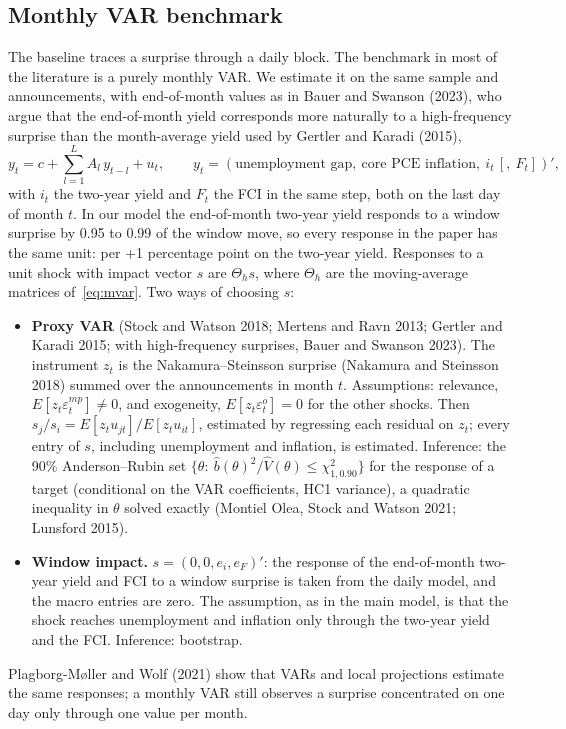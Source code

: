 \documentclass[11pt]{article}
\begin{document}
\subsection{Monthly VAR benchmark}
The baseline traces a surprise through a daily block. The benchmark in most of the literature is a purely monthly VAR. We estimate it on the same sample and announcements, with end-of-month values as in Bauer and Swanson (2023), who argue that the end-of-month yield corresponds more naturally to a high-frequency surprise than the month-average yield used by Gertler and Karadi (2015),
\begin{equation}\label{eq:mvar} y_t = c + \sum_{l=1}^{L} A_l\, y_{t-l} + u_t,\qquad y_t=(\text{unemployment gap},\ \text{core PCE inflation},\ i_t\,[,\ F_t])',\end{equation}
with $i_t$ the two-year yield and $F_t$ the FCI in the same step, both on the last day of month $t$. In our model the end-of-month two-year yield responds to a window surprise by 0.95 to 0.99 of the window move, so every response in the paper has the same unit: per +1 percentage point on the two-year yield. Responses to a unit shock with impact vector $s$ are $\Theta_h s$, where $\Theta_h$ are the moving-average matrices of~\eqref{eq:mvar}. Two ways of choosing $s$:
\begin{itemize}
\item \textbf{Proxy VAR} (Stock and Watson 2018; Mertens and Ravn 2013; Gertler and Karadi 2015; with high-frequency surprises, Bauer and Swanson 2023). The instrument $z_t$ is the Nakamura--Steinsson surprise (Nakamura and Steinsson 2018) summed over the announcements in month $t$. Assumptions: relevance, $E[z_t\varepsilon^{mp}_t]\neq 0$, and exogeneity, $E[z_t\varepsilon^{o}_t]=0$ for the other shocks. Then $s_j/s_i = E[z_t u_{jt}]/E[z_t u_{it}]$, estimated by regressing each residual on $z_t$; every entry of $s$, including unemployment and inflation, is estimated. Inference: the 90\% Anderson--Rubin set $\{\theta:\ \hat b(\theta)^2/\hat V(\theta)\le\chi^2_{1,0.90}\}$ for the response of a target (conditional on the VAR coefficients, HC1 variance), a quadratic inequality in $\theta$ solved exactly (Montiel Olea, Stock and Watson 2021; Lunsford 2015).
\item \textbf{Window impact.} $s=(0,0,e_i,e_F)'$: the response of the end-of-month two-year yield and FCI to a window surprise is taken from the daily model, and the macro entries are zero. The assumption, as in the main model, is that the shock reaches unemployment and inflation only through the two-year yield and the FCI. Inference: bootstrap.
\end{itemize}
Plagborg-M{\o}ller and Wolf (2021) show that VARs and local projections estimate the same responses; a monthly VAR still observes a surprise concentrated on one day only through one value per month.


\end{document}
